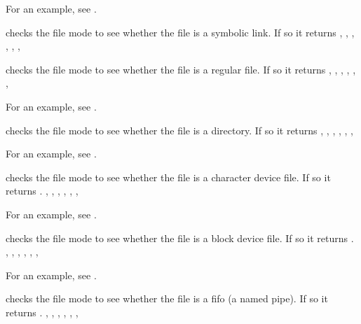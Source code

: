 For an example, see .

{  checks the file mode  to see whether the file is a
symbolic link. If so it returns 
}
{,
 ,
 ,
 ,
 ,
 ,
}



{  checks the file mode  to see whether the file is a
regular file. If so it returns 
}
{,
 , 
 ,
 ,
 ,
 ,
}

For an example, see .

{  checks the file mode  to see whether the file is a
directory. If so it returns 
}
{,
 , 
 ,
 ,
 ,
 ,
}

For an example, see .

{  checks the file mode  to see whether the file is a
character device file. If so it returns .
}
{,
 , 
 ,
 ,
 ,
 ,
}

For an example, see .

{  checks the file mode  to see whether the file is a
block device file. If so it returns .
}
{,
 , 
 ,
 ,
 ,
 ,
}

For an example, see .

{  checks the file mode  to see whether the file is a
fifo (a named pipe). If so it returns .
}
{,
 , 
 ,
 ,
 ,
 ,
}


